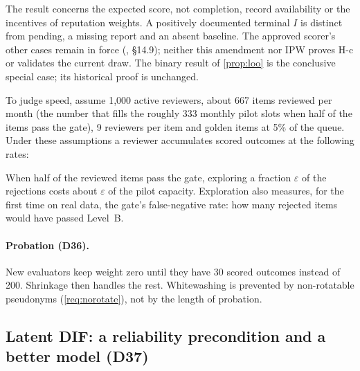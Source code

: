 The result concerns the expected score, not completion, record availability or the incentives
of reputation weights. A positively documented terminal $I$ is distinct from pending,
a missing report and an absent baseline. The approved scorer's other cases remain in force
(, \S14.9); neither this amendment nor IPW proves H-c or validates the current
draw. The binary result of \cref{prop:loo} is the conclusive special case; its historical
proof is unchanged.

To judge speed, assume 1{,}000 active reviewers, about 667 items reviewed per month (the number
that fills the roughly 333 monthly pilot slots when half of the items pass the gate), 9 reviewers
per item and golden items at 5\% of the queue. Under these assumptions a reviewer accumulates
scored outcomes at the following rates:

\begin{center}\small
{}
\end{center}

When half of the reviewed items pass the gate, exploring a fraction $\varepsilon$ of the rejections
costs about $\varepsilon$ of the pilot capacity. Exploration also measures, for the first time on
real data, the gate's false-negative rate: how many rejected items would have passed Level~B.

\paragraph{Probation (D36).} New evaluators keep weight zero until they have 30 scored outcomes
instead of 200. Shrinkage then handles the rest. Whitewashing is prevented by non-rotatable
pseudonyms (\cref{req:norotate}), not by the length of probation.

\subsection{Latent DIF: a reliability precondition and a better model (D37)}

